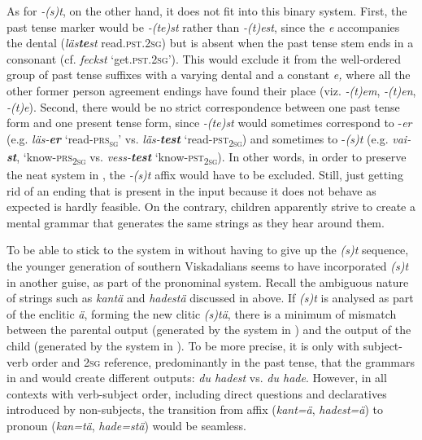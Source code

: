 \documentclass[output=paper,colorlinks,citecolor=brown,draft,draftmode]{langscibook}
\begin{document}
As for \textit{-(s)t}, on the other hand, it does not fit into this binary system. First, the past tense marker would be \textit{-(te)st} rather than \textit{-(t)est}, since the \textit{e} accompanies the dental (\textit{läs\textbf{{te}}\textit{st}} read.\textsc{pst}.2\textsc{sg}) but is absent when the past tense stem ends in a consonant (cf. \textit{feckst} ‘get.\textsc{pst}.2\textsc{sg}’). This would exclude it from the well-ordered group of past tense suffixes with a varying dental and a constant \textit{e,} where all the other former person agreement endings have found their place (viz. \textit{\nobreakdash-(t)em}, \textit{-(t)en}, \textit{-(t)e}). Second, there would be no strict correspondence between one past tense form and one present tense form, since \textit{-(te)st} would sometimes correspond to -\textit{er} (e.g. \textit{läs-\textbf{{er}}} ‘read-\textsc{prs}\textsc{\textsubscript{sg}}’ vs. \textit{läs-\textbf{{test}}} ‘read-\textsc{pst}\textsubscript{2}\textsc{\textsubscript{sg}}) and sometimes to -\textit{(s)t} (e.g. \textit{vai-\textbf{{st}}}, ‘know-\textsc{prs}\textsubscript{2}\textsc{\textsubscript{sg}} vs. \textit{vess\nobreakdash-\textbf{{test}}} ‘know-\textsc{pst}\textsubscript{2}\textsc{\textsubscript{sg}}). In other words, in order to preserve the neat system in , the \textit{-(s)t} affix would have to be excluded. Still, just getting rid of an ending that is present in the input because it does not behave as expected is hardly feasible. On the contrary, children apparently strive to create a mental grammar that generates the same strings as they hear around them.



To be able to stick to the system in  without having to give up the \textit{(s)t} sequence, the younger generation of southern Viskadalians seems to have incorporated \textit{(s)t} in another guise, as part of the pronominal system. Recall the ambiguous nature of strings such as \textit{kantä} and \textit{hadestä} discussed in  above. If \textit{(s)t} is analysed as part of the enclitic \textit{ä}, forming the new clitic \textit{(s)tä}, there is a minimum of mismatch between the parental output (generated by the system in ) and the output of the child (generated by the system in ). To be more precise, it is only with subject-verb order and 2\textsc{sg} reference, predominantly in the past tense, that the grammars in  and  would create different outputs: \textit{du hadest} vs. \textit{du hade}. However, in all contexts with verb-subject order, including direct questions and declaratives introduced by non-subjects, the transition from affix (\textit{kant=ä}, \textit{hadest=ä}) to pronoun (\textit{kan=tä}, \textit{hade=stä}) would be seamless.
\end{document}
